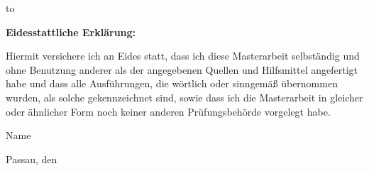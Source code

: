 \thispagestyle{empty}
\vspace*{31\baselineskip}
\hbox to \textwidth{\hrulefill}
\par
\textbf{Eidesstattliche Erklärung:}

Hiermit versichere ich an Eides statt, dass ich diese Masterarbeit selbständig und
ohne Benutzung anderer als der angegebenen Quellen und Hilfsmittel angefertigt
habe und dass alle Ausführung\-en, die wörtlich oder sinngemäß übernommen wurden,
als solche gekenn\-zeichnet sind, sowie dass ich die Masterarbeit in gleicher oder
ähnlicher Form noch keiner anderen Prüfungsbehörde vorgelegt habe.

\vspace*{20pt}

Name

Passau, den \thefullgermandate
%
%

\clearpage
